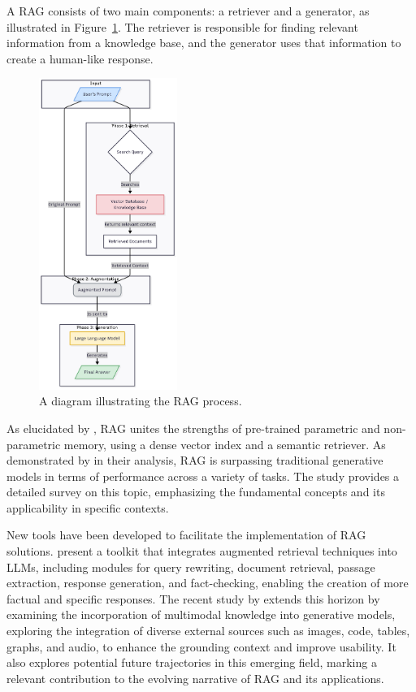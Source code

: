             A RAG consists of two main components: a retriever and a generator, as illustrated in Figure~\ref{fig:rag_diagram}. The retriever is responsible for finding relevant information from a knowledge base, and the generator uses that information to create a human-like response. 
            
            \begin{figure}[h!]
                \centering
                \includegraphics[width=0.4\textwidth]{images/rag_diagram_vertical.png}
                \caption{A diagram illustrating the RAG process.}
                \label{fig:rag_diagram}
            \end{figure}         

            As elucidated by \citet{Lewis2020}, RAG unites the strengths of pre-trained parametric and non-parametric memory, using a dense vector index and a semantic retriever. 
            As demonstrated by \citet{Li2022} in their analysis, RAG is surpassing traditional generative models in terms of performance across a variety of tasks. The study provides a detailed survey on this topic, emphasizing the fundamental concepts and its applicability in specific contexts.

            New tools have been developed to facilitate the implementation of RAG solutions. \citet{Liu2023} present a toolkit that integrates augmented retrieval techniques into LLMs, including modules for query rewriting, document retrieval, passage extraction, response generation, and fact-checking, enabling the creation of more factual and specific responses. The recent study by \citet{Zhao2023} extends this horizon by examining the incorporation of multimodal knowledge into generative models, exploring the integration of diverse external sources such as images, code, tables, graphs, and audio, to enhance the grounding context and improve usability. It also explores potential future trajectories in this emerging field, marking a relevant contribution to the evolving narrative of RAG and its applications.

